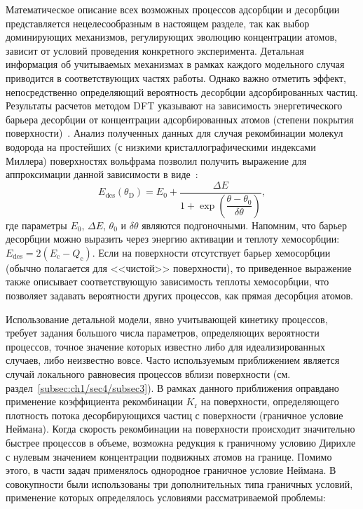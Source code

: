 Математическое описание всех возможных процессов адсорбции и десорбции представляется нецелесообразным в настоящем разделе, так как выбор доминирующих механизмов, регулирующих эволюцию концентрации атомов, зависит от условий проведения конкретного эксперимента. Детальная информация об учитываемых механизмах в рамках каждого модельного случая приводится в соответствующих частях работы. Однако важно отметить эффект, непосредственно определяющий вероятность десорбции адсорбированных частиц. Результаты расчетов методом DFT указывают на зависимость энергетического барьера десорбции от концентрации адсорбированных атомов (степени покрытия поверхности)~\cite{Piazza2018,Ajmalghan2019,Ferro2023}. Анализ полученных данных для случая рекомбинации молекул водорода на простейших (с низкими кристаллографическими индексами Миллера) поверхностях вольфрама позволил получить выражение для аппроксимации данной зависимости в виде~\cite{Hodille2021}:
\begin{equation}
    \label{eq:ch2/Edes_coverage}
    E_\mathrm{des}(\theta_\mathrm{D}) = E_0 + \dfrac{\Delta E}{1+\exp\left( \dfrac{\theta-\theta_0}{\delta\theta} \right)},
\end{equation}
где параметры $E_0$, $\Delta E$, $\theta_0$ и $\delta\theta$ являются подгоночными. Напомним, что барьер десорбции можно выразить через энергию активации и теплоту хемосорбции: \( E_\mathrm{des} = 2(E_\mathrm{c}-Q_\mathrm{c}) \). Если на поверхности отсутствует барьер хемосорбции (обычно полагается для <<чистой>> поверхности), то приведенное выражение также описывает соответствующую зависимость теплоты хемосорбции, что позволяет задавать вероятности других процессов, как прямая десорбция атомов.

Использование детальной модели, явно учитывающей кинетику процессов, требует задания большого числа параметров, определяющих вероятности процессов, точное значение которых известно либо для идеализированных случаев, либо неизвестно вовсе. Часто используемым приближением является случай локального равновесия процессов вблизи поверхности (см. раздел~\cref{subsec:ch1/sec4/subsec3}). В рамках данного приближения оправдано применение коэффициента рекомбинации \( K_\mathrm{r} \) на поверхности, определяющего плотность потока десорбирующихся частиц с поверхности (граничное условие Неймана). Когда скорость рекомбинации на поверхности происходит значительно быстрее процессов в объеме, возможна редукция к граничному условию Дирихле с нулевым значением концентрации подвижных атомов на границе. Помимо этого, в части задач применялось однородное граничное условие Неймана. В совокупности были использованы три дополнительных типа граничных условий, применение которых определялось условиями рассматриваемой проблемы:

